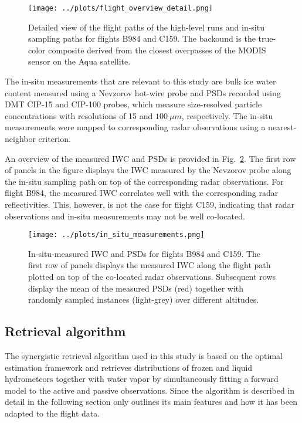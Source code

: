 \documentclass[journal abbreviation, manuscript]{copernicus}
\begin{document}
\begin{figure}[h!]
  \centering
  \texttt{[image: ../plots/flight\_overview\_detail.png]}
  \caption{
    Detailed view of the flight paths of the high-level runs and in-situ sampling
    paths for flights B984 and C159. The backound is the true-color composite
    derived from the closest overpasses of the MODIS \citep{modis} sensor
    on the Aqua satellite.
    }
  \label{fig:flight_overview_detail}
\end{figure}

The in-situ measurements that are relevant to this study are bulk ice water
content measured using a Nevzorov hot-wire probe \citep{korolev13} and PSDs
recorded using DMT CIP-15 and CIP-100 probes, which measure size-resolved
particle concentrations with resolutions of 15 and $100\ \unit{\mu m}$,
respectively. The in-situ measurements were mapped to corresponding radar
observations using a nearest-neighbor criterion.

An overview of the measured IWC and PSDs is provided in
Fig.~\ref{fig:in_situ}. The first row of panels in the figure displays the IWC
measured by the Nevzorov probe along the in-situ sampling path on top of the
corresponding radar observations. For flight B984, the measured IWC correlates
well with the corresponding radar reflectivities. This, however, is not the case
for flight C159, indicating that radar observations and in-situ measurements may
not be well co-located.

\begin{figure}[hbpt!]
  \centering
  \texttt{[image: ../plots/in\_situ\_measurements.png]}
  \caption{
    In-situ-measured IWC and PSDs for flights B984 and C159. The first row of
    panels displays the measured IWC along the flight path plotted on top of the
    co-located radar observations. Subsequent rows display the mean of the
    measured PSDs (red) together with randomly sampled instances (light-grey)
    over different altitudes.
    }
  \label{fig:in_situ}
\end{figure}

\subsection{Retrieval algorithm}
\label{sec:synergistic_retrieval}

The synergistic retrieval algorithm used in this study is based on the optimal
estimation framework \citep{rodgers00} and retrieves distributions of frozen and
liquid hydrometeors together with water vapor by simultaneously fitting a
forward model to the active and passive observations. Since the algorithm is
described in detail in \citet{pfreundschuh20} the following section only
outlines its main features and how it has been adapted to the flight data.
\end{document}
